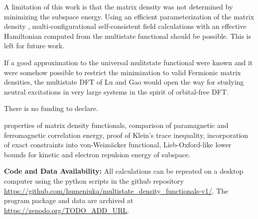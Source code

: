 \documentclass[journal=jpclcd,manuscript=letter]{achemso}
\begin{document}
A limitation of this work is that the matrix density was not determined by minimizing the subspace energy.
Using an efficient parameterization of the matrix density \cite[theorem (3)]{Lu2022JPCL} \cite{Lu2022fundamental},
multi-configurational self-consistent field calculations with an effective Hamiltonian computed from the multistate functional
should be possible. This is left for future work.

If a good approximation to the universal mulitstate functional
were known and it were somehow possible to restrict the minimization to valid Fermionic matrix densities,
the multistate DFT of Lu and Gao would open the way for studying neutral excitations in very large systems
in the spirit of orbital-free DFT.

\begin{acknowledgement}
There is no funding to declare.
\end{acknowledgement}


\begin{suppinfo}
properties of matrix density functionals,
comparison of paramagnetic and ferromagnetic correlation energy,
proof of Klein's trace inequality,
incorporation of exact constraints into von-Weizs\"{a}cker functional,
Lieb-Oxford-like lower bounds for kinetic and electron repulsion energy of subspace.

\textbf{Code and Data Availability:}
All calculations can be repeated on a desktop computer using the python scripts
in the github repository
\url{https://github.com/humeniuka/multistate_density_functionals-v1/}.
The program package and data are archived at \url{https://zenodo.org/TODO_ADD_URL}.

\end{suppinfo}


\end{document}
